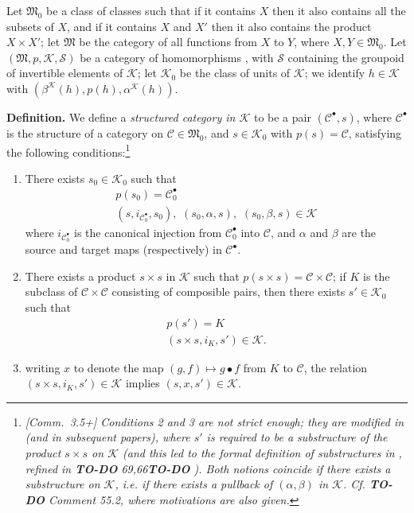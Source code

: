 \documentclass{article}
\newenvironment{rmenv}[1]
  {\phantomsection\par\medskip\noindent\textbf{#1.}\rmfamily}
  {\par\medskip}
\newcommand{\todo}{{\color{purple}\textbf{TO-DO }}}
\newcommand{\CC}{\mathcal{C}}
\newcommand{\MM}{\mathfrak{M}}
\newcommand{\KK}{\mathcal{K}}
\renewcommand{\SS}{\mathcal{S}}
\begin{document}
Let $\MM_0$ be a class of classes such that if it contains $X$ then it also contains all the subsets of $X$, and if it contains $X$ and $X'$ then it also contains the product $X\times X'$;
let $\MM$ be the category of all functions from $X$ to $Y$, where $X,Y\in\MM_0$.
Let $(\MM,p,\KK,\SS)$ be a category of homomorphisms \cite{1}, with $\SS$ containing the groupoid of invertible elements of $\KK$;
let $\KK_0$ be the class of units of $\KK$;
we identify $h\in\KK$ with $(\beta^\KK(h),p(h),\alpha^\KK(h))$.

\begin{rmenv}{Definition}
  We define a \emph{structured category in $\KK$} to be a pair $(\CC^\bullet,s)$, where $\CC^\bullet$ is the structure of a category on $\CC\in\MM_0$, and $s\in\KK_0$ with $p(s)=\CC$, satisfying the following conditions:\footnote{\emph{[Comm.~3.5+] Conditions 2 and 3 are not strict enough; they are modified in \cite{CW63} (and in subsequent papers), where $s'$ is required to be a substructure of the product $s\times s$ on $\KK$ (and this led to the formal definition of substructures in \cite{CW63}, refined in \todo{69,66}\todo). Both notions coincide if there exists a substructure on $\KK$, i.e. if there exists a pullback of $(\alpha,\beta)$ in $\KK$. Cf. \todo{Comment 55.2}, where motivations are also given.}}
  \begin{enumerate}
    \item There exists $s_0\in\KK_0$ such that
      \[
        \begin{gathered}
          p(s_0)
          = \CC_0^\bullet
        \\(s,i_{\CC_0^\bullet},s_0),\,\,
          (s_0,\alpha,s),\,\,
          (s_0,\beta,s)
          \in\KK
        \end{gathered}
      \]
      where $i_{\CC_0^\bullet}$ is the canonical injection from $\CC_0^\bullet$ into $\CC$, and $\alpha$ and $\beta$ are the source and target maps (respectively) in $\CC^\bullet$.
    \item There exists a product $s\times s$ in $\KK$ such that $p(s\times s)=\CC\times\CC$;
      if $K$ is the subclass of $\CC\times\CC$ consisting of composible pairs, then there exists $s'\in\KK_0$ such that
      \[
        \begin{gathered}
          p(s')=K
        \\(s\times s,i_K,s')\in\KK.
        \end{gathered}
      \]
    \item writing $x$ to denote the map $(g,f)\mapsto g\bullet f$ from $K$ to $\CC$, the relation $(s\times s,i_K,s')\in\KK$ implies $(s,x,s')\in\KK$.
  \end{enumerate}
\end{rmenv}
\end{document}

